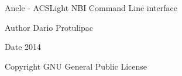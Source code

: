 Ancle -\/ A\-C\-S\-Light N\-B\-I Command Line interface \begin{DoxyAuthor}{Author}
Dario Protulipac 
\end{DoxyAuthor}
\begin{DoxyDate}{Date}
2014 
\end{DoxyDate}
\begin{DoxyCopyright}{Copyright}
G\-N\-U General Public License 
\end{DoxyCopyright}
